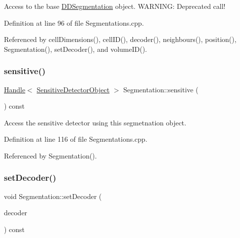 Access to the base \hyperlink{namespace_d_d4hep_1_1_d_d_segmentation}{D\+D\+Segmentation} object. W\+A\+R\+N\+I\+NG\+: Deprecated call! 



Definition at line 96 of file Segmentations.\+cpp.



Referenced by cell\+Dimensions(), cell\+I\+D(), decoder(), neighbours(), position(), Segmentation(), set\+Decoder(), and volume\+I\+D().

\hypertarget{class_d_d4hep_1_1_geometry_1_1_segmentation_ad8adcfc054aec5a68f37c54752e12d40}{}\label{class_d_d4hep_1_1_geometry_1_1_segmentation_ad8adcfc054aec5a68f37c54752e12d40} 
\subsubsection{\texorpdfstring{sensitive()}{sensitive()}}
{\footnotesize\ttfamily \hyperlink{class_d_d4hep_1_1_handle}{Handle}$<$ \hyperlink{class_d_d4hep_1_1_geometry_1_1_sensitive_detector_object}{Sensitive\+Detector\+Object} $>$ Segmentation\+::sensitive (\begin{DoxyParamCaption}{ }\end{DoxyParamCaption}) const}



Access the sensitive detector using this segmetnation object. 



Definition at line 116 of file Segmentations.\+cpp.



Referenced by Segmentation().

\hypertarget{class_d_d4hep_1_1_geometry_1_1_segmentation_a6a403aeaae687498508b537513eb1867}{}\label{class_d_d4hep_1_1_geometry_1_1_segmentation_a6a403aeaae687498508b537513eb1867} 
\subsubsection{\texorpdfstring{set\+Decoder()}{setDecoder()}}
{\footnotesize\ttfamily void Segmentation\+::set\+Decoder (\begin{DoxyParamCaption}\item[{\hyperlink{class_d_d4hep_1_1_d_d_segmentation_1_1_bit_field64}{Bit\+Field64} $\ast$}]{decoder }\end{DoxyParamCaption}) const}



